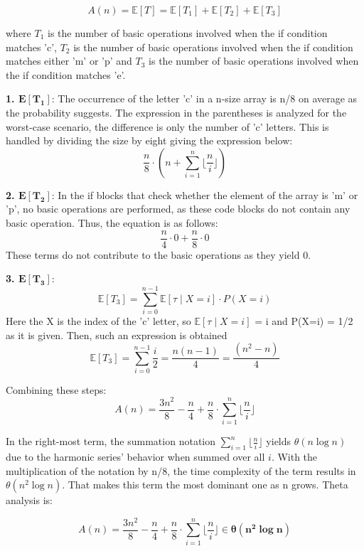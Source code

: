 \documentclass[11pt, oneside, a4paper]{article}
\begin{document}
\[
A(n) = \mathbb{E}[T] = \mathbb{E}[T_1] + \mathbb{E}[T_2] + \mathbb{E}[T_3]
\]

 where $T_1$ is the number of basic operations involved when the if condition matches 'c', $T_2$ is the number of basic operations involved when the if condition matches either 'm' or 'p' and $T_3$ is the number of basic operations involved when the if condition matches 'e'.

\textbf{1. $\mathbf{E[T_1]}$}:
 The occurrence of the letter 'c' in a n-size array is n/8 on average as the probability suggests. The expression in the parentheses is analyzed for the worst-case scenario, the difference is only the number of 'c' letters. This is handled by dividing the size by eight giving the expression below:
   \[
   \frac{n}{8} \cdot \left( n +  \sum_{i=1}^{n} \lfloor \frac{n}{i} \rfloor \right)\]
   

\textbf{2. $\mathbf{E[T_2]}$}:
In the if blocks that check whether the element of the array is 'm' or 'p', no basic operations are performed, as these code blocks do not contain any basic operation. Thus, the equation is as follows:
   \[\frac{n}{4} \cdot 0 + \frac{n}{8} \cdot 0 \]
   These terms do not contribute to the basic operations as they yield 0.

\textbf{3. $\mathbf{E[T_3]}$}:
\[
\mathbb{E}[T_3] = \sum_{i=0}^{n-1} \mathbb{E}[\tau \mid X=i] \cdot P(X=i)
\]
Here the X is the index of the 'c' letter, so $\mathbb{E}[\tau \mid X=i]$ = i and P(X=i) = 1/2 as it is given.
Then, such an expression is obtained \[\mathbb{E}[T_3] = \sum_{i=0}^{n-1} \frac{i}{2} = \frac{n(n-1)}{4} = \frac{(n^2 - n)}{4}\]

Combining these steps:
\begin{equation*}
A(n) = \frac{3n^2}{8} - \frac{n}{4} + \frac{n}{8} \cdot  \sum_{i=1}^{n} \lfloor \frac{n}{i} \rfloor 
\end{equation*}

In the right-most term, the summation notation \(\sum_{i=1}^{n} \lfloor \frac{n}{i} \rfloor\) yields \(\theta(n \log n)\) due to the harmonic series' behavior when summed over all \( i \). With the multiplication of the notation by n/8, the time complexity of the term results in \(\theta(n^2 \log n)\). That makes this term the most dominant one as n grows. Theta analysis is:



\[
A(n) = \frac{3n^2}{8} - \frac{n}{4} + \frac{n}{8} \cdot  \sum_{i=1}^{n} \lfloor \frac{n}{i} \rfloor  \in \boldsymbol{\theta(n^2 \log n)}
\]
\end{document}
